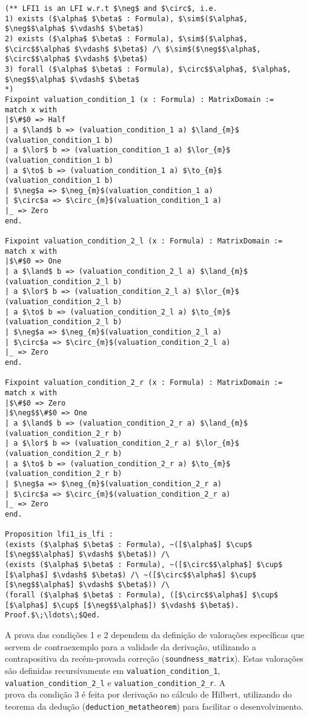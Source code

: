         \begin{lstlisting}[name=LFI, frame=single, language=coq]
(** LFI1 is an LFI w.r.t $\neg$ and $\circ$, i.e. 
1) exists ($\alpha$ $\beta$ : Formula), $\sim$($\alpha$, $\neg$$\alpha$ $\vdash$ $\beta$)
2) exists ($\alpha$ $\beta$ : Formula), $\sim$($\alpha$, $\circ$$\alpha$ $\vdash$ $\beta$) /\ $\sim$($\neg$$\alpha$, $\circ$$\alpha$ $\vdash$ $\beta$)
3) forall ($\alpha$ $\beta$ : Formula), $\circ$$\alpha$, $\alpha$, $\neg$$\alpha$ $\vdash$ $\beta$
*)
Fixpoint valuation_condition_1 (x : Formula) : MatrixDomain :=
match x with 
|$\#$0 => Half
| a $\land$ b => (valuation_condition_1 a) $\land_{m}$ (valuation_condition_1 b)
| a $\lor$ b => (valuation_condition_1 a) $\lor_{m}$ (valuation_condition_1 b)
| a $\to$ b => (valuation_condition_1 a) $\to_{m}$ (valuation_condition_1 b)
| $\neg$a => $\neg_{m}$(valuation_condition_1 a)
| $\circ$a => $\circ_{m}$(valuation_condition_1 a)
|_ => Zero 
end.

Fixpoint valuation_condition_2_l (x : Formula) : MatrixDomain :=
match x with 
|$\#$0 => One
| a $\land$ b => (valuation_condition_2_l a) $\land_{m}$ (valuation_condition_2_l b)
| a $\lor$ b => (valuation_condition_2_l a) $\lor_{m}$ (valuation_condition_2_l b)
| a $\to$ b => (valuation_condition_2_l a) $\to_{m}$ (valuation_condition_2_l b)
| $\neg$a => $\neg_{m}$(valuation_condition_2_l a)
| $\circ$a => $\circ_{m}$(valuation_condition_2_l a)
|_ => Zero 
end.

Fixpoint valuation_condition_2_r (x : Formula) : MatrixDomain :=
match x with 
|$\#$0 => Zero
|$\neg$$\#$0 => One
| a $\land$ b => (valuation_condition_2_r a) $\land_{m}$ (valuation_condition_2_r b)
| a $\lor$ b => (valuation_condition_2_r a) $\lor_{m}$ (valuation_condition_2_r b)
| a $\to$ b => (valuation_condition_2_r a) $\to_{m}$ (valuation_condition_2_r b)
| $\neg$a => $\neg_{m}$(valuation_condition_2_r a)
| $\circ$a => $\circ_{m}$(valuation_condition_2_r a)
|_ => Zero 
end.

Proposition lfi1_is_lfi :
(exists ($\alpha$ $\beta$ : Formula), ~([$\alpha$] $\cup$ [$\neg$$\alpha$] $\vdash$ $\beta$)) /\
(exists ($\alpha$ $\beta$ : Formula), ~([$\circ$$\alpha$] $\cup$ [$\alpha$] $\vdash$ $\beta$) /\ ~([$\circ$$\alpha$] $\cup$ [$\neg$$\alpha$] $\vdash$ $\beta$)) /\
(forall ($\alpha$ $\beta$ : Formula), ([$\circ$$\alpha$] $\cup$ [$\alpha$] $\cup$ [$\neg$$\alpha$]) $\vdash$ $\beta$).
Proof.$\;\ldots\;$Qed.
        \end{lstlisting}

        A prova das condições 1 e 2 dependem da definição de valorações específicas que servem de contraexemplo para a validade da derivação, utilizando a contrapositiva da recém-provada correção (\texttt{soundness\_matrix}). Estas valorações são definidas recursivamente em \texttt{valuation\_condition\_1}, \texttt{valuation\_condition\_2\_l} e \texttt{valuation\_condition\_2\_r}. A\\prova da condição 3 é feita por derivação no cálculo de Hilbert, utilizando do teorema da dedução (\texttt{deduction\_metatheorem}) para facilitar o desenvolvimento.
    
